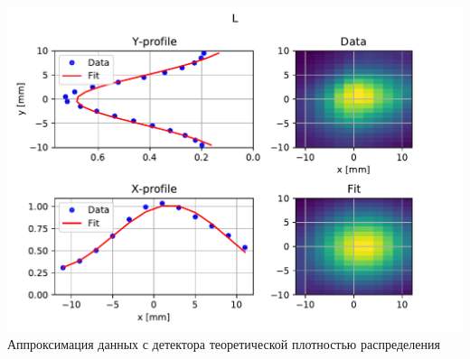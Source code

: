 \documentclass[12pt,aspectratio=169]{beamer}
\begin{document}
\begin{frame}
\begin{columns}
\begin{minipage}[t][1.\textheight]{\linewidth}
{			\includegraphics[width=1\linewidth]{data_fit_L_P063-014_Q053-003_V085-003.pdf}\\
			\footnotesize{Аппроксимация данных с детектора теоретической плотностью распределения}
		}
		
		\end{minipage}%
	\end{columns}	
\end{frame}
\end{document}

